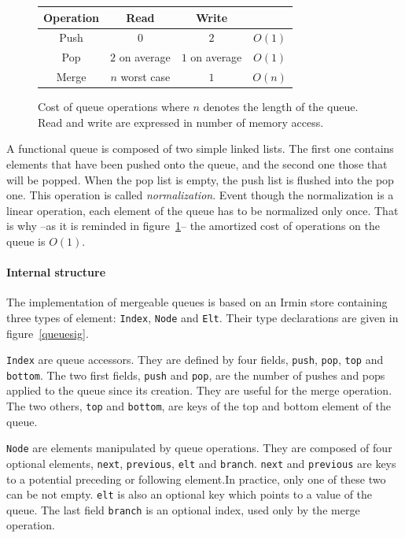 \documentclass{article}
\newcommand{\irmin}{Irmin\xspace}
\newcommand{\code}[1]{\texttt{#1}}
\begin{document}
\begin{figure}[hbt]
\centering
\setlength{\tabcolsep}{0.5cm}
\begin{tabular}{|c|c|c|c|}
\hline
	Operation &
	Read &
	Write &
	\\
\hline
	Push &
	\cellcolor{chameleon!20} $0$ &
	\cellcolor{chameleon!20} $2$ &
	\cellcolor{chameleon!20} $O(1)$ \\
\hline
	Pop &
	\cellcolor{butter!20} $2$ on average &
	\cellcolor{butter!20} $1$ on average &
	\cellcolor{chameleon!20} $O(1)$ \\
\hline
\hline
	Merge &
	\cellcolor{scarletred!20} $n$ worst case &
	\cellcolor{chameleon!20} $1$ &
	\cellcolor{butter!20} $O(n)$ \\
\hline
\end{tabular}
\caption{Cost of queue operations where $n$ denotes the length of the queue. Read and write are expressed in number of memory access.}
\label{queuetable}
\end{figure}

A functional queue is composed of two simple linked lists.
The first one contains elements that have been pushed onto the queue, and the second one those that will be popped.
When the pop list is empty, the push list is flushed into the pop one.
This operation is called \emph{normalization}.
Event though the normalization is a linear operation,  each element of the queue has to be normalized only once.
That is why --as it is reminded in figure~\ref{queuetable}-- the amortized cost of operations on the queue is $O(1)$.

\paragraph{Internal structure}
The implementation of mergeable queues is based on an \irmin store containing three types of element: \code{Index}, \code{Node} and \code{Elt}. Their type declarations are given in figure~\ref{queuesig}.

\code{Index} are queue accessors.
They are defined by four fields, \code{push}, \code{pop}, \code{top} and \code{bottom}.
The two first fields, \code{push} and \code{pop}, are the number of pushes and pops applied to the queue since its creation.
They are useful for the merge operation.
The two others, \code{top} and \code{bottom}, are keys of the top and bottom element of the queue.

\code{Node} are elements manipulated by queue operations.
They are composed of four optional elements, \code{next}, \code{previous}, \code{elt} and \code{branch}. \code{next} and \code{previous} are keys to a potential preceding or following element.In practice, only one of these two can be not empty. \code{elt} is also an optional key which points to a value of the queue. The last field \code{branch} is an optional index, used only by the merge operation.
\end{document}
